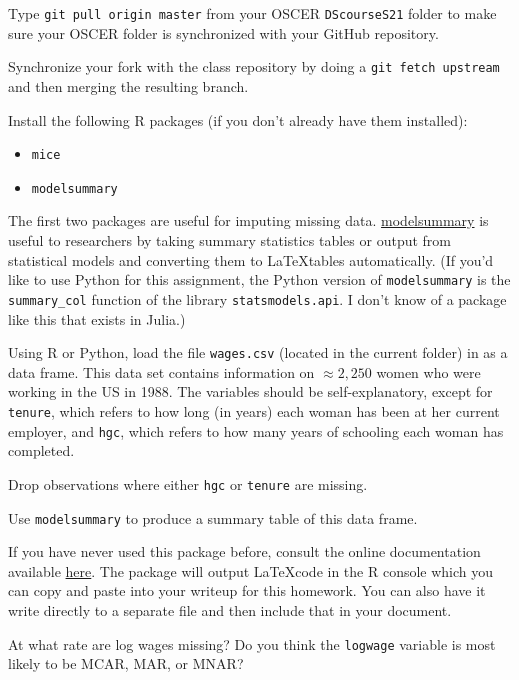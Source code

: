 \documentclass[12pt,english]{exam}
\begin{document}
\begin{questions}
\question Type \texttt{git pull origin master} from your OSCER \texttt{DScourseS21} folder to make sure your OSCER folder is synchronized with your GitHub repository. 

\question Synchronize your fork with the class repository by doing a \texttt{git fetch upstream} and then merging the resulting branch. 

\question Install the following R packages (if you don't already have them installed):
\begin{itemize}
    \item \texttt{mice}
    \item \texttt{modelsummary}
\end{itemize}

The first two packages are useful for imputing missing data.
\href{https://vincentarelbundock.github.io/modelsummary/}{modelsummary} is useful to researchers by taking summary statistics tables or output from statistical models and converting them to \LaTeX tables automatically. (If you'd like to use Python for this assignment, the Python version of \texttt{modelsummary} is the \texttt{summary\_col} function of the library \texttt{statsmodels.api}. I don't know of a package like this that exists in Julia.)

\question Using R or Python, load the file \texttt{wages.csv} (located in the current folder) in as a data frame. This data set contains information on $\approx 2,250$ women who were working in the US in 1988. The variables should be self-explanatory, except for \texttt{tenure}, which refers to how long (in years) each woman has been at her current employer, and \texttt{hgc}, which refers to how many years of schooling each woman has completed.

\question Drop observations where either \texttt{hgc} or \texttt{tenure} are missing.

\question Use \texttt{modelsummary} to produce a summary table of this data frame.

If you have never used this package before, consult the online documentation available \href{https://vincentarelbundock.github.io/modelsummary/}{here}. The package will output \LaTeX code in the R console which you can copy and paste into your writeup for this homework. You can also have it write directly to a separate file and then include that in your document.

At what rate are log wages missing? Do you think the \texttt{logwage} variable is most likely to be MCAR, MAR, or MNAR?


\end{questions}
\end{document}
